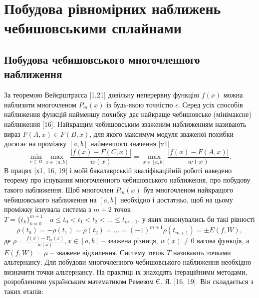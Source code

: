 \documentclass[ukrainian,14pt]{extarticle}
\begin{document}
\newpage


\section{Побудова рівномірних наближень чебишовськими сплайнами}
\subsection{Побудова чебишовського многочленного наближення}
За теоремою Вейєрштрасса [1,21] довільну неперервну функцію $f(x)$  можна наблизити многочленом $P_m(x)$ із будь-якою точністю $\epsilon$. Серед усіх способів наближення функцій найменшу похибку дає найкраще чебишовське (мінімаксне) наближення [16]. Найкращим чебишовським зваженим наближенням називають вираз $F(A, x) \in F(B, x)$, для якого максимум модуля зваженої похибки досягає на проміжку $[a, b]$ найменшого значення [x1]
\begin{equation}\label{eq:formula1}
    \min_{c \in B} \max_{x \in [a,b]} \frac{|f(x) - F(C,x)|}{w(x)} = \max_{x \in [a,b]} \frac{|f(x) - F(A,x)|}{w(x)}.
\end{equation}
В працях [х1, 16, 19] і моїй бакалаврській кваліфікаційній роботі наведено теорему про існування многочленного чебишовського наближення, про побудову такого наближення. Щоб многочлен $P_m(x)$ був многочленом найкращого чебишовського наближення на $[a, b]$ необхідно і достатньо, щоб на цьому проміжку існувала система з $m+2$ точок $T=\{t_k\}_{k=0}^{m+1} \quad a \leq t_0 < t_1 < t_2 < \ldots \leq t_{m+1}$, у яких виконувались би такі рівності
\begin{equation}\label{eq:formula2}
    \rho(t_0) = -\rho(t_1) = \rho(t_2) = \ldots = (-1)^{m+1}\rho(t_{m+1}) = \pm E(f,W),
\end{equation}
де $\rho = \frac{f(x) - P_m(x)}{w(x)}, x \in [a, b]$  – зважена різниця, $w(x) \neq 0$ вагова функція, а $E(f,W) = \mu$ – зважене відхилення. Систему точок $T$ називають точками альтернансу. Для побудови многочленного чебишовського наближення необхідно визначити точки альтернансу. На практиці їх знаходять ітераційними методами, розробленими українським математиком Ремезом Є. Я. [16, 19]. Він складається з таких етапів:
\end{document}
